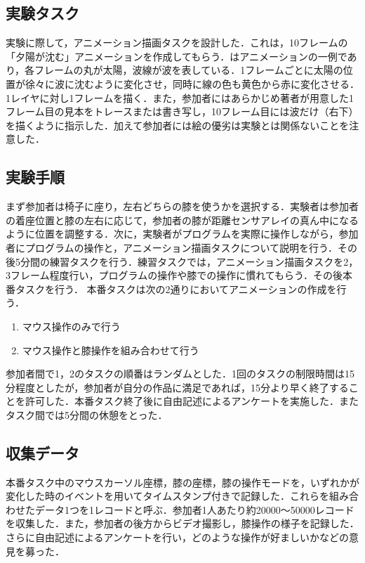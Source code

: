 \documentclass[submit, techrep]{ipsj}
\begin{document}
\subsection{実験タスク}
実験に際して，アニメーション描画タスクを設計した．これは，10フレームの「夕陽が沈む」アニメーションを作成してもらう．はアニメーションの一例であり，各フレームの丸が太陽，波線が波を表している．1フレームごとに太陽の位置が徐々に波に沈むように変化させ，同時に線の色も黄色から赤に変化させる．1レイヤに対し1フレームを描く．また，参加者にはあらかじめ著者が用意した1フレーム目の見本をトレースまたは書き写し，10フレーム目には波だけ（右下）を描くように指示した．加えて参加者には絵の優劣は実験とは関係ないことを注意した．
\subsection{実験手順}
まず参加者は椅子に座り，左右どちらの膝を使うかを選択する．実験者は参加者の着座位置と膝の左右に応じて，参加者の膝が距離センサアレイの真ん中になるように位置を調整する．次に，実験者がプログラムを実際に操作しながら，参加者にプログラムの操作と，アニメーション描画タスクについて説明を行う．その後5分間の練習タスクを行う．練習タスクでは，アニメーション描画タスクを2，3フレーム程度行い，プログラムの操作や膝での操作に慣れてもらう．その後本番タスクを行う．
本番タスクは次の2通りにおいてアニメーションの作成を行う．
\begin{enumerate}
	\item マウス操作のみで行う
	\item マウス操作と膝操作を組み合わせて行う
\end{enumerate}
参加者間で1，2のタスクの順番はランダムとした．1回のタスクの制限時間は15分程度としたが，参加者が自分の作品に満足であれば，15分より早く終了することを許可した．本番タスク終了後に自由記述によるアンケートを実施した．またタスク間では5分間の休憩をとった．
\subsection{収集データ}
本番タスク中のマウスカーソル座標，膝の座標，膝の操作モードを，いずれかが変化した時のイベントを用いてタイムスタンプ付きで記録した．これらを組み合わせたデータ1つを1レコードと呼ぶ．参加者1人あたり約20000〜50000レコードを収集した．また，参加者の後方からビデオ撮影し，膝操作の様子を記録した．さらに自由記述によるアンケートを行い，どのような操作が好ましいかなどの意見を募った．
\end{document}
